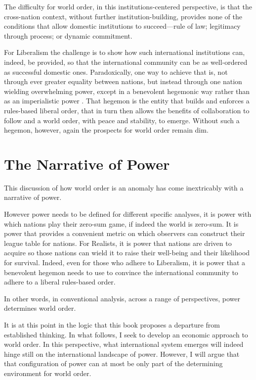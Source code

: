 The difficulty for world order, in this
institutions-centered perspective,
is that the cross-nation context,
without further institution-building, provides none of the conditions
that allow domestic institutions to succeed---rule of law;
legitimacy through process; or dynamic commitment.

For Liberalism the challenge is to show how such
international institutions can, indeed, be provided, so that
the international community can be as well-ordered as successful
domestic ones.
Paradoxically, one way to achieve that is, not through
ever greater equality between nations, but instead through one
nation wielding overwhelming power,
except in a benevolent hegemonic way rather than as an imperialistic
power
\citep{Ikenberry-GJ-2015-The-Future-of-Liberal-World-Order,%
Kindleberger-C-1973-World-in-Depression%
}.
That hegemon is the entity that builds and enforces
a rules-based liberal order,
that in turn then allows the benefits of collaboration to follow
and
a world order, with peace and stability, to emerge.
Without such a hegemon, however, again the prospects for world order
remain dim.


\section{The Narrative of Power}

This discussion of how world order is an anomaly has come inextricably with
a narrative of power.

However power needs to be defined for different specific analyses,
it is power with which nations play their zero-sum game,
if indeed the world is zero-sum.
It is power that provides a convenient metric on which
observers can construct their league table for nations.
For Realists, it is power that nations are driven to acquire so
those nations can wield it to raise their well-being and their likelihood
for survival.
Indeed, even for those who adhere to Liberalism, it is power
that a benevolent hegemon needs to use to convince the international community
to adhere to a liberal rules-based order.

In other words, in conventional analysis, across a range of perspectives,
power determines world order.

It is at this point in the logic that this book
proposes a departure from established thinking.
In what follows, I seek to develop an economic approach to world order.
In this perspective, what international system emerges
will indeed hinge still on the international landscape of power.
However, I will argue that that configuration of power can
at most be only part of
the determining environment for world order.

